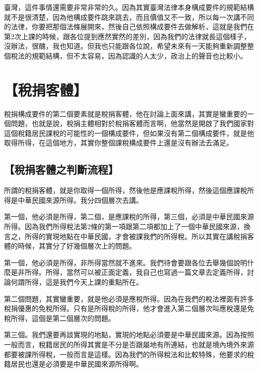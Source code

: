 \documentclass[oneside,sub3section]{ctexbook}
\begin{document}
臺灣，這件事情還需要非常非常的久。因為其實臺灣法律本身構成要件的規範結構就不是很清楚，因為他構成要件跳來跳去，而且價值又不一致，所以每一次講不同的法律，你要把那個法條展開來，然後自己依照構成要件去做解析，這就是我們在第2次上課的時候，跟各位提到應然實然的差別，因為我們的法律就長這個樣子，沒辦法，很醜，我也知道。但我也只能跟各位說，希望未來有一天能夠重新調整整個稅法的規範結構，但不太容易，因為認識的人太少，政治上的聲音也比較小。

\hypertarget{ux7a05ux6350ux5ba2ux9ad4}{%
\section{【稅捐客體】}\label{ux7a05ux6350ux5ba2ux9ad4}}

稅捐構成要件的第二個要素就是稅捐客體，他在討論上面來講，其實是蠻重要的一個問題，也就是說，稅捐主體相對於稅捐客體而言啊，他當然是開啟了我們國家對這個稅籍居民課稅的可能性的一個構成要件，但如果沒有第二個構成要件，就是他取得所得，在這個地方，其實你整個課稅構成要件上還是沒有辦法去滿足。

\hypertarget{ux7a05ux6350ux5ba2ux9ad4ux4e4bux5224ux65b7ux6d41ux7a0b}{%
\subsection{【稅捐客體之判斷流程】}\label{ux7a05ux6350ux5ba2ux9ad4ux4e4bux5224ux65b7ux6d41ux7a0b}}

所謂的稅捐客體，就是你取得一個所得，然後他是應課稅所得，然後這個應課稅所得是中華民國來源所得。我分四個層次去講。

第一個，他必須是所得，第二個，是應課稅的所得，第三個，必須是中華民國來源所得。因為我們所得稅法第2條的第一項跟第二項都加上了一個中華民國來源，換言之，所得的實現地點在中華民國，才會被課我們的所得稅。所以其實在講稅捐客體的時候，其實分了好幾個層次上的問題。

第一個，他必須是所得，非所得當然就不進來。我們待會要跟各位去舉幾個說明什麼是非所得。所得，當然可以被正面定義，我自己也寫過一篇文章去定義所得，討論何謂所得，這是我們今天上課的重點所在。

第二個問題，其實蠻重要，就是他必須是應稅所得。因為在我們的稅法裡面有許多稅捐優惠的免稅所得。只有是所得稅的所得，他才會進入第二個層次叫應稅還是免稅所得，這個是第二個層次的問題。

第三個。我們還要再談實現的地點，實現的地點必須要是中華民國來源。因為按照一般而言，稅籍居民的所得其實是不分是否跟屬地有所連結，也就是境內境外來源都要被課所得稅，一般而言是這樣。因為我們的所得稅法和比較特殊，他要求的稅籍居民也還是必須要是中華民國來源所得啊。
\end{document}
